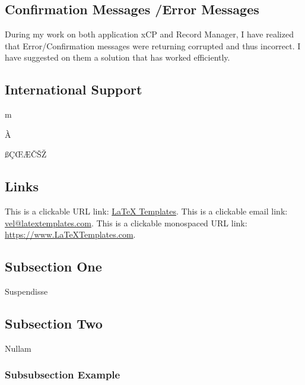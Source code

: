 \documentclass[
	a4paper, %
	10pt, %
	unnumberedsections, %
	twoside, %
]{LTJournalArticle}
\begin{document}
\subsection{Confirmation Messages /Error Messages}

During my work on both application xCP and Record Manager, I have realized that Error/Confirmation messages were returning corrupted and thus incorrect. I have suggested on them a solution that has worked efficiently. 

\subsection{International Support}

\noindent m

\noindent À

\noindent ßÇŒÆČŠŽ

\subsection{Links}

This is a clickable URL link: \href{https://www.latextemplates.com}{LaTeX Templates}. This is a clickable email link: \href{mailto:vel@latextemplates.com}{vel@latextemplates.com}. This is a clickable monospaced URL link: \url{https://www.LaTeXTemplates.com}.



\subsection{Subsection One}

Suspendisse

\subsection{Subsection Two}

Nullam

\subsubsection{Subsubsection Example}
 


\printbibliography %

\end{document}
